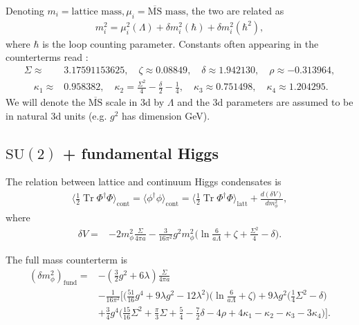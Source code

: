 \documentclass[11pt,a4paper]{article}
\newcommand\Tr{\operatorname{Tr}}
\newcommand\MSbar{$\overline{\text{MS}}$ } %
\newcommand\he[1]{#1^\dagger}%
\newcommand\gr[1]{\mathrm{#1}}%
\begin{document}
Denoting $m_i = \text{lattice mass}, \mu_i = \text{\MSbar mass}$, the two are related as 
\begin{align}
m^2_i = \mu^2_i(\Lambda) + \delta m^2_i(\hbar) + \delta m^2_i(\hbar^2),
\end{align}
where $\hbar$ is the loop counting parameter. Constants often appearing in the counterterms read \cite{Laine:1997dy}: 
\begin{align}
\Sigma \approx& 3.17591153625, \quad \zeta \approx 0.08849, \quad \delta \approx 1.942130, \quad \rho \approx -0.313964, \nonumber \\ 
\quad \kappa_1 \approx& 0.958382, \quad \kappa_2 = \frac{\Sigma^2}{4} - \frac{\delta}{2} - \frac14, \quad \kappa_3 \approx 0.751498, \quad \kappa_4 \approx 1.204295.
\end{align}
We will denote the \MSbar scale in 3d by $\Lambda$ and the 3d parameters are assumed to be in natural 3d units (e.g. $g^2$ has dimension GeV).

\subsection{$\gr{SU(2)}$ + fundamental Higgs}

The relation between lattice and continuum Higgs condensates is 
\begin{align}
\langle \frac12\Tr\he\Phi\Phi\rangle_\text{cont} = \langle\phi^\dagger\phi\rangle_\text{cont} = \langle \frac12\Tr\he\Phi\Phi\rangle_\text{latt} + \frac{d(\delta V)}{dm^2_\phi}, 
\end{align}
where 
\begin{align}
\label{eq:vacuumCT_higgs}
\delta V =& - 2 m^2_\phi \frac{\Sigma}{4\pi a} - \frac{3}{16\pi^2} g^2 m^2_\phi \Big( \ln \frac{6}{a \Lambda} +\zeta + \frac{\Sigma^2}{4} - \delta \Big).
\end{align}

The full mass counterterm is
\begin{align}
(\delta m^2_\phi)_\text{fund} =& -(\frac32 g^2 + 6\lambda) \frac{\Sigma}{4\pi a} \nonumber \\
&- \frac{1}{16\pi^2}\Big[ \Big( \frac{51}{16}g^4 + 9\lambda g^2 - 12\lambda^2 \Big)\Big( \ln \frac{6}{a\Lambda}+\zeta \Big)
 + 9\lambda g^2 \Big( \frac14 \Sigma^2 - \delta \Big) \nonumber \\ 
& + \frac34 g^4 \Big( \frac{15}{16}\Sigma^2 + \frac{\pi}{3} \Sigma + \frac54 - \frac72 \delta - 4\rho +4\kappa_1 - \kappa_2 - \kappa_3 - 3\kappa_4  \Big) \Big].
\end{align}
\end{document}

